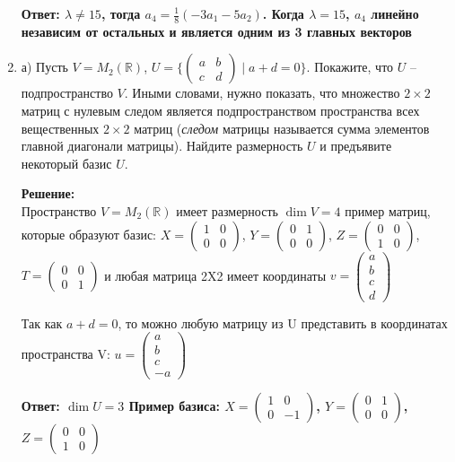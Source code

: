 \documentclass[a4paper,12pt]{article}
\begin{document}
\begin{enumerate}
\textbf{Ответ: $\lambda \neq 15$, тогда $a_4 = \frac{1}{8}(-3a_1-5a_2)$. Когда $\lambda = 15$, $a_4$ линейно независим от остальных и является одним из 3 главных векторов}

\item а) Пусть $V = M_2(\mathbb{R})$, $U = \{\left(\begin{smallmatrix}
a & b \\
c & d
\end{smallmatrix} \right) \mid a + d = 0\}$. Покажите, что $U$ -- подпространство $V$. Иными словами, нужно показать, что множество $2\times 2$ матриц с нулевым следом является подпространством пространства всех вещественных $2\times 2$ матриц ({\it следом} матрицы называется сумма элементов главной диагонали матрицы).
Найдите размерность $U$ и предъявите некоторый базис $U$.

\textbf{Решение:}\\
Пространство $V = M_2(\mathbb{R})$ имеет размерность $\dim V = 4$ пример матриц, которые образуют базис: $X = \left(\begin{smallmatrix}
1 & 0 \\
0 & 0
\end{smallmatrix} \right)$, $Y = \left(\begin{smallmatrix}
0 & 1 \\
0 & 0
\end{smallmatrix} \right)$, $Z = \left(\begin{smallmatrix}
0 & 0 \\
1 & 0
\end{smallmatrix} \right)$, $T = \left(\begin{smallmatrix}
0 & 0 \\
0 & 1
\end{smallmatrix} \right)$ и любая матрица 2X2 имеет координаты $v = 
\begin{pmatrix}
{a}\\{b}\\{c}\\{d}
\end{pmatrix}$ 

Так как $a+d=0$, то можно любую матрицу из U представить в координатах пространства V: $u = \begin{pmatrix}
{a}\\{b}\\{c}\\{-a}\end{pmatrix}$


\textbf{Ответ:
$\dim U = 3$ 
Пример базиса:
$X = \left(\begin{smallmatrix}
1 & 0 \\
0 & -1
\end{smallmatrix} \right)$, $Y = \left(\begin{smallmatrix}
0 & 1 \\
0 & 0
\end{smallmatrix} \right)$, $Z = \left(\begin{smallmatrix}
0 & 0 \\
1 & 0
\end{smallmatrix} \right)$}




\end{enumerate}
\end{document}
